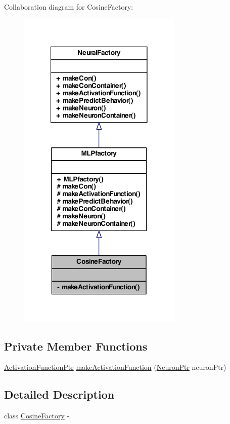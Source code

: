 Collaboration diagram for CosineFactory:
\nopagebreak
\begin{figure}[H]
\begin{center}
\leavevmode
\includegraphics[width=222pt]{class_cosine_factory__coll__graph}
\end{center}
\end{figure}
\subsection*{Private Member Functions}
\begin{DoxyCompactItemize}
\item 
\hyperlink{_a_m_o_r_e_8h_a77602a0277a02e5769c3df0adc669b17}{ActivationFunctionPtr} \hyperlink{class_cosine_factory_a7db770cbd419032850a7e4f09b0836cc}{makeActivationFunction} (\hyperlink{_a_m_o_r_e_8h_ac1ea936c2c7728eb382278131652fef4}{NeuronPtr} neuronPtr)
\end{DoxyCompactItemize}


\subsection{Detailed Description}
class \hyperlink{class_cosine_factory}{CosineFactory} -\/ 


